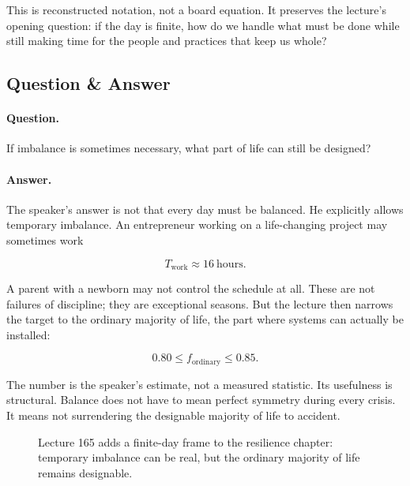 \documentclass[11pt,oneside]{book}
\begin{document}
This is reconstructed notation, not a board equation. It preserves the lecture's opening question: if the day is finite, how do we handle what must be done while still making time for the people and practices that keep us whole?

\subsection{Question \& Answer}

\paragraph{Question.}
If imbalance is sometimes necessary, what part of life can still be designed?

\paragraph{Answer.}
The speaker's answer is not that every day must be balanced. He explicitly allows temporary imbalance. An entrepreneur working on a life-changing project may sometimes work

\[
T_{\mathrm{work}}\approx 16\ \mathrm{hours}.
\]

A parent with a newborn may not control the schedule at all. These are not failures of discipline; they are exceptional seasons. But the lecture then narrows the target to the ordinary majority of life, the part where systems can actually be installed:

\[
0.80 \leq f_{\mathrm{ordinary}} \leq 0.85.
\]

The number is the speaker's estimate, not a measured statistic. Its usefulness is structural. Balance does not have to mean perfect symmetry during every crisis. It means not surrendering the designable majority of life to accident.

\begin{figure}
\centering
{}
\caption{Lecture 165 adds a finite-day frame to the resilience chapter: temporary imbalance can be real, but the ordinary majority of life remains designable.}
\end{figure}
\end{document}
